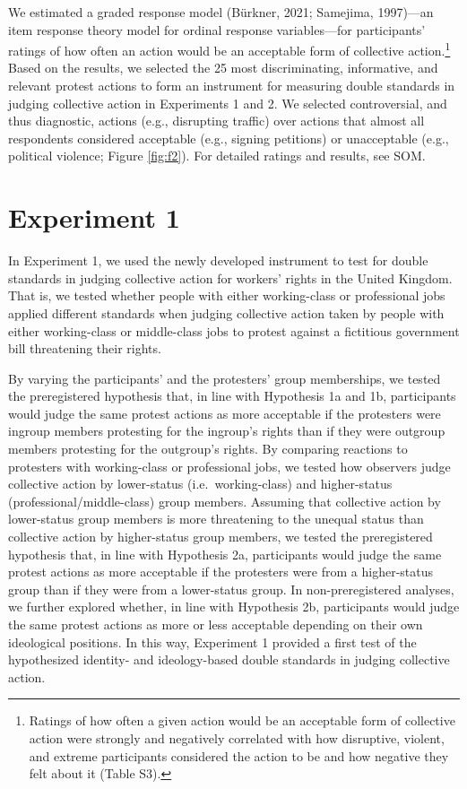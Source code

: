 \documentclass[twocolumn, 11pt, letterpaper]{article}
\begin{document}
We estimated a graded response model (Bürkner, 2021; Samejima,
1997)---an item response theory model for ordinal response
variables---for participants' ratings of how often an action would be an
acceptable form of collective action.\footnote{Ratings of how often a
  given action would be an acceptable form of collective action were
  strongly and negatively correlated with how disruptive, violent, and
  extreme participants considered the action to be and how negative they
  felt about it (Table S3).} Based on the results, we selected the 25
most discriminating, informative, and relevant protest actions to form
an instrument for measuring double standards in judging collective
action in Experiments 1 and 2. We selected controversial, and thus
diagnostic, actions (e.g., disrupting traffic) over actions that almost
all respondents considered acceptable (e.g., signing petitions) or
unacceptable (e.g., political violence; Figure \ref{fig:f2}). For
detailed ratings and results, see SOM.

\hypertarget{experiment-1}{%
\section{Experiment 1}\label{experiment-1}}

In Experiment 1, we used the newly developed instrument to test for
double standards in judging collective action for workers' rights in the
United Kingdom. That is, we tested whether people with either
working-class or professional jobs applied different standards when
judging collective action taken by people with either working-class or
middle-class jobs to protest against a fictitious government bill
threatening their rights.

By varying the participants' and the protesters' group memberships, we
tested the preregistered hypothesis that, in line with Hypothesis 1a and
1b, participants would judge the same protest actions as more acceptable
if the protesters were ingroup members protesting for the ingroup's
rights than if they were outgroup members protesting for the outgroup's
rights. By comparing reactions to protesters with working-class or
professional jobs, we tested how observers judge collective action by
lower-status (i.e.~working-class) and higher-status
(professional/middle-class) group members. Assuming that collective
action by lower-status group members is more threatening to the unequal
status than collective action by higher-status group members, we tested
the preregistered hypothesis that, in line with Hypothesis 2a,
participants would judge the same protest actions as more acceptable if
the protesters were from a higher-status group than if they were from a
lower-status group. In non-preregistered analyses, we further explored
whether, in line with Hypothesis 2b, participants would judge the same
protest actions as more or less acceptable depending on their own
ideological positions. In this way, Experiment 1 provided a first test
of the hypothesized identity- and ideology-based double standards in
judging collective action.
\end{document}
